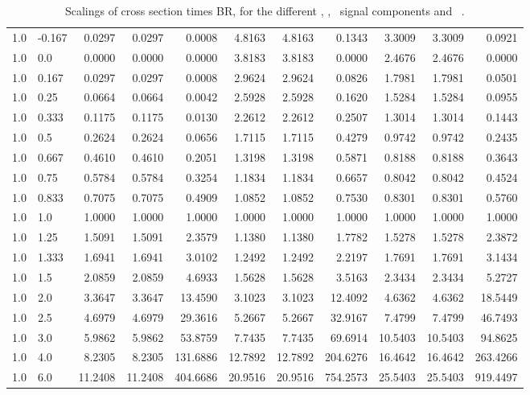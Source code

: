 \begin{landscape}
\begin{table}[h!]
\begin{tabular}{ll rrr rrr rrr}
   1.0 & -0.167 & 0.0297  & 0.0297  & 0.0008   & 4.8163  & 4.8163  & 0.1343    & 3.3009  & 3.3009  & 0.0921 \\
   1.0 & 0.0    & 0.0000  & 0.0000  & 0.0000   & 3.8183  & 3.8183  & 0.0000    & 2.4676  & 2.4676  & 0.0000 \\
   1.0 & 0.167  & 0.0297  & 0.0297  & 0.0008   & 2.9624  & 2.9624  & 0.0826    & 1.7981  & 1.7981  & 0.0501 \\
   1.0 & 0.25   & 0.0664  & 0.0664  & 0.0042   & 2.5928  & 2.5928  & 0.1620    & 1.5284  & 1.5284  & 0.0955 \\
   1.0 & 0.333  & 0.1175  & 0.1175  & 0.0130   & 2.2612  & 2.2612  & 0.2507    & 1.3014  & 1.3014  & 0.1443 \\
   1.0 & 0.5    & 0.2624  & 0.2624  & 0.0656   & 1.7115  & 1.7115  & 0.4279    & 0.9742  & 0.9742  & 0.2435 \\
   1.0 & 0.667  & 0.4610  & 0.4610  & 0.2051   & 1.3198  & 1.3198  & 0.5871    & 0.8188  & 0.8188  & 0.3643 \\
   1.0 & 0.75   & 0.5784  & 0.5784  & 0.3254   & 1.1834  & 1.1834  & 0.6657    & 0.8042  & 0.8042  & 0.4524 \\
   1.0 & 0.833  & 0.7075  & 0.7075  & 0.4909   & 1.0852  & 1.0852  & 0.7530    & 0.8301  & 0.8301  & 0.5760 \\
   1.0 & 1.0    & 1.0000  & 1.0000  & 1.0000   & 1.0000  & 1.0000  & 1.0000    & 1.0000  & 1.0000  & 1.0000 \\
   1.0 & 1.25   & 1.5091  & 1.5091  & 2.3579   & 1.1380  & 1.1380  & 1.7782    & 1.5278  & 1.5278  & 2.3872 \\
   1.0 & 1.333  & 1.6941  & 1.6941  & 3.0102   & 1.2492  & 1.2492  & 2.2197    & 1.7691  & 1.7691  & 3.1434 \\
   1.0 & 1.5    & 2.0859  & 2.0859  & 4.6933   & 1.5628  & 1.5628  & 3.5163    & 2.3434  & 2.3434  & 5.2727 \\
   1.0 & 2.0    & 3.3647  & 3.3647  & 13.4590  & 3.1023  & 3.1023  & 12.4092   & 4.6362  & 4.6362  & 18.5449 \\
   1.0 & 2.5    & 4.6979  & 4.6979  & 29.3616  & 5.2667  & 5.2667  & 32.9167   & 7.4799  & 7.4799  & 46.7493 \\
   1.0 & 3.0    & 5.9862  & 5.9862  & 53.8759  & 7.7435  & 7.7435  & 69.6914   & 10.5403 & 10.5403 & 94.8625 \\
   1.0 & 4.0    & 8.2305  & 8.2305  & 131.6886 & 12.7892 & 12.7892 & 204.6276  & 16.4642 & 16.4642 & 263.4266 \\
   1.0 & 6.0    & 11.2408 & 11.2408 & 404.6686 & 20.9516 & 20.9516 & 754.2573  & 25.5403 & 25.5403 & 919.4497 \\\hline
  \end{tabular}
  \caption[Scalings of $\sigma\times$BR for the signal components and \ ]{Scalings of cross section times BR, for the different \ttH, \tHq, \tHW\ signal components and \ .}\label{tab:xsbrscalingK6_1}
\end{table}


\end{landscape}
